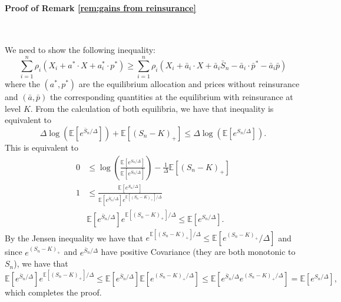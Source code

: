 \documentclass[fleqn,mnsc,nonblindrev]{informs4}
\newcommand{\EE}{\mathbb{E}}
\begin{document}
\paragraph{Proof of 
Remark \ref{rem:gains from reinsurance}}
\

We need to show the following inequality:
\begin{equation}\label{inequality insurance}
\sum_{i=1}^n\rho_i(X_i+a^*\cdot X+a_i^*\cdot p^*)\geq \sum_{i=1}^n \rho_i(X_i+\bar{a}_i\cdot X +\bar{a}_i\bar{S}_n -\bar{a}_i\cdot \bar{p}^* -\bar{a}_i\bar{p})
\end{equation}
where the $(a^*,p^*)$ are the equilibrium allocation and prices without reinsurance and $(\bar{a},\bar{p})$ the corresponding quantities at the equilibrium with reinsurance at level $K$. From the calculation of both equilibria, we have that inequality is equivalent to 
\begin{equation}\label{inequality insurance2}
\Delta\log\left(\EE[e^{\bar{S}_n/\Delta}]\right)+\EE[(S_n-K)_+]\leq    \Delta\log\left(\EE[e^{S_n/\Delta}]\right). 
\end{equation}
This is equivalent to 
\begin{align*}
0 &\leq \log\left(\frac{\EE[e^{S_n/\Delta}]}{\EE[e^{\bar{S}_n/\Delta}]}\right)-\frac{1}{\Delta}\EE[(S_n-K)_+]\\   
1 &\leq \frac{\EE[e^{S_n/\Delta}]}{\EE[e^{\bar{S}_n/\Delta}]e^{\EE[(S_n-K)_+]/\Delta}}\\
& \EE[e^{\bar{S}_n/\Delta}]e^{\EE[(S_n-K)_+]/\Delta} \leq \EE[e^{S_n/\Delta}].
\end{align*}
By the Jensen inequality we have that $e^{\EE[(S_n-K)_+]/\Delta}\leq \EE[e^{(S_n-K)_+}/\Delta] $ and since $e^{(S_n-K)_+}$ and $e^{\bar{S}_n/\Delta}$ have positive Covariance (they are both monotonic to $S_n$), we have that 
\[\EE[e^{\bar{S}_n/\Delta}]e^{\EE[(S_n-K)_+]/\Delta}\leq \EE[e^{\bar{S}_n/\Delta}]\EE[e^{(S_n-K)_+/\Delta}]\leq \EE[e^{\bar{S}_n/\Delta}e^{(S_n-K)_+/\Delta}]= \EE[e^{S_n/\Delta}], \]
which completes the proof. 

\bigskip



\end{document}
